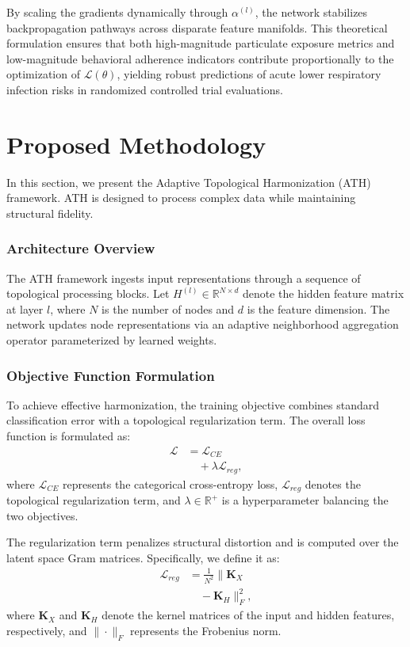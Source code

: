 \documentclass[10pt,twocolumn]{article}
\begin{document}
By scaling the gradients dynamically through $\alpha^{(l)}$, the network stabilizes backpropagation pathways across disparate feature manifolds. This theoretical formulation ensures that both high-magnitude particulate exposure metrics and low-magnitude behavioral adherence indicators contribute proportionally to the optimization of $\mathcal{L}(\theta)$, yielding robust predictions of acute lower respiratory infection risks in randomized controlled trial evaluations.

\section{Proposed Methodology}
In this section, we present the Adaptive 
Topological Harmonization (ATH) framework.
ATH is designed to process complex data 
while maintaining structural fidelity.

\subsubsection{Architecture Overview}
The ATH framework ingests input 
representations through a sequence of 
topological processing blocks. 
Let $H^{(l)} \in \mathbb{R}^{N \times d}$ 
denote the hidden feature matrix at 
layer $l$, where $N$ is the number of 
nodes and $d$ is the feature dimension. 
The network updates node representations 
via an adaptive neighborhood aggregation 
operator parameterized by learned 
weights.

\subsubsection{Objective Function Formulation}
To achieve effective harmonization, 
the training objective combines standard 
classification error with a topological 
regularization term. 
The overall loss function is 
formulated as:
\begin{equation}
\begin{aligned}
\mathcal{L} &= \mathcal{L}_{CE} 
\\ &\quad + \lambda 
\mathcal{L}_{reg},
\end{aligned}
\end{equation}
where $\mathcal{L}_{CE}$ represents 
the categorical cross-entropy loss, 
$\mathcal{L}_{reg}$ denotes the 
topological regularization term, and 
$\lambda \in \mathbb{R}^+$ is a 
hyperparameter balancing the two 
objectives.

The regularization term penalizes 
structural distortion and is computed 
over the latent space Gram matrices. 
Specifically, we define it as:
\begin{equation}
\begin{aligned}
\mathcal{L}_{reg} &= \frac{1}{N^2} 
\| \mathbf{K}_X 
\\ &\quad - \mathbf{K}_H \|_F^2,
\end{aligned}
\end{equation}
where $\mathbf{K}_X$ and 
$\mathbf{K}_H$ denote the kernel 
matrices of the input and hidden 
features, respectively, and 
$\|\cdot\|_F$ represents the 
Frobenius norm.
\end{document}
